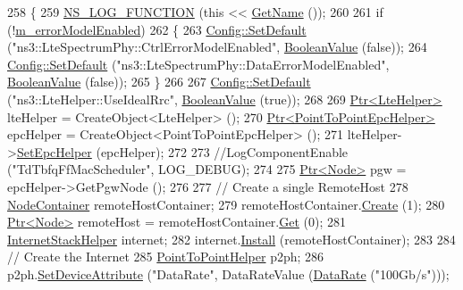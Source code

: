 \begin{DoxyCode}
258 \{
259   \hyperlink{log-macros-disabled_8h_a90b90d5bad1f39cb1b64923ea94c0761}{NS\_LOG\_FUNCTION} (\textcolor{keyword}{this} << \hyperlink{classns3_1_1TestCase_a28f7bb59669c24dae1c290fc17fc9b62}{GetName} ());
260 
261   \textcolor{keywordflow}{if} (!\hyperlink{classLenaTdTbfqFfMacSchedulerTestCase1_a2ded050f1bd85fcdb810b384e681ea08}{m\_errorModelEnabled})
262     \{
263       \hyperlink{group__config_ga2e7882df849d8ba4aaad31c934c40c06}{Config::SetDefault} (\textcolor{stringliteral}{"ns3::LteSpectrumPhy::CtrlErrorModelEnabled"}, 
      \hyperlink{classns3_1_1BooleanValue}{BooleanValue} (\textcolor{keyword}{false}));
264       \hyperlink{group__config_ga2e7882df849d8ba4aaad31c934c40c06}{Config::SetDefault} (\textcolor{stringliteral}{"ns3::LteSpectrumPhy::DataErrorModelEnabled"}, 
      \hyperlink{classns3_1_1BooleanValue}{BooleanValue} (\textcolor{keyword}{false}));
265     \}
266 
267   \hyperlink{group__config_ga2e7882df849d8ba4aaad31c934c40c06}{Config::SetDefault} (\textcolor{stringliteral}{"ns3::LteHelper::UseIdealRrc"}, 
      \hyperlink{classns3_1_1BooleanValue}{BooleanValue} (\textcolor{keyword}{true}));
268 
269   \hyperlink{classns3_1_1Ptr}{Ptr<LteHelper>} lteHelper = CreateObject<LteHelper> ();
270   \hyperlink{classns3_1_1Ptr}{Ptr<PointToPointEpcHelper>}  epcHelper = CreateObject<PointToPointEpcHelper> ();
271   lteHelper->\hyperlink{classns3_1_1LteHelper_a324079a1ccd54ce949786b83d6b95915}{SetEpcHelper} (epcHelper);
272 
273   \textcolor{comment}{//LogComponentEnable ("TdTbfqFfMacScheduler", LOG\_DEBUG);}
274 
275   \hyperlink{classns3_1_1Ptr}{Ptr<Node>} pgw = epcHelper->GetPgwNode ();
276 
277   \textcolor{comment}{// Create a single RemoteHost}
278   \hyperlink{classns3_1_1NodeContainer}{NodeContainer} remoteHostContainer;
279   remoteHostContainer.\hyperlink{classns3_1_1NodeContainer_a787f059e2813e8b951cc6914d11dfe69}{Create} (1);
280   \hyperlink{classns3_1_1Ptr}{Ptr<Node>} remoteHost = remoteHostContainer.\hyperlink{classns3_1_1NodeContainer_a9ed96e2ecc22e0f5a3d4842eb9bf90bf}{Get} (0);
281   \hyperlink{classns3_1_1InternetStackHelper}{InternetStackHelper} internet;
282   internet.\hyperlink{classns3_1_1InternetStackHelper_a6645b412f31283d2d9bc3d8a95cebbc0}{Install} (remoteHostContainer);
283 
284   \textcolor{comment}{// Create the Internet}
285   \hyperlink{classns3_1_1PointToPointHelper}{PointToPointHelper} p2ph;
286   p2ph.\hyperlink{classns3_1_1PointToPointHelper_a4577f5ab8c387e5528af2e0fbab1152e}{SetDeviceAttribute} (\textcolor{stringliteral}{"DataRate"}, DataRateValue (\hyperlink{classns3_1_1DataRate}{DataRate} (\textcolor{stringliteral}{"100Gb/s"})));

\end{DoxyCode}
